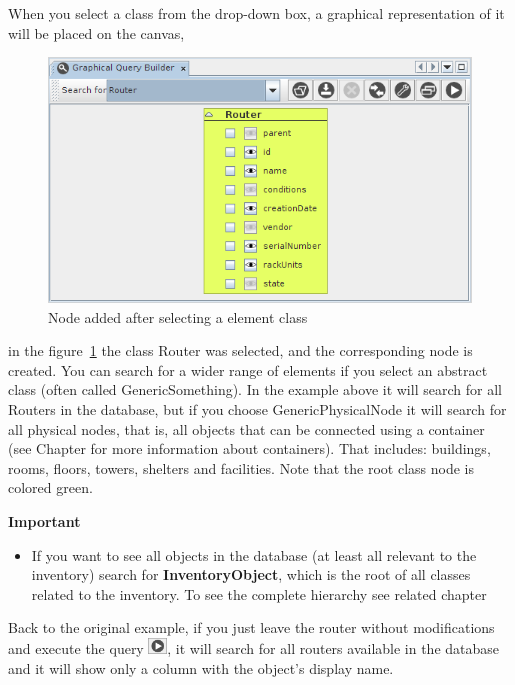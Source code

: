 \documentclass[a4paper]{article}
\begin{document}
	When you select a class from the drop-down box, a graphical representation of it will be placed on the canvas,
	\begin{figure}[h!]
		\centering
		\includegraphics[width=0.9\linewidth]{img/querying_node_added.png}
		\caption{Node added after selecting a element class}
		\label{fig:query_node_added}
	\end{figure}
	in the figure~\ref{fig:query_node_added} the class Router was selected, and the corresponding node is created. You can search for a wider range of elements if you select an abstract class (often called GenericSomething). In the example above it will search for all Routers in the database, but if you choose GenericPhysicalNode it will search for all physical nodes, that is, all objects that can be connected using a container (see Chapter \textbf{} for more information about containers). That includes: buildings, rooms, floors, towers, shelters and facilities. Note that the root class node is colored green.
	
	\newpage
	\begin{framed} {\large \textbf{Important}}
		\begin{itemize}
			\item If you want to see all objects in the database (at least all relevant to the inventory) search for \textbf{InventoryObject}, which is the root of all classes related to the inventory. To see the complete hierarchy see related chapter \textbf{}
		\end{itemize}
	\end{framed}
	
	Back to the original example, if you just leave the router without modifications and execute the query \includegraphics[width=0.5cm]{img/icon_execute_query.png}, it will search for all routers available in the database and it will show only a column with the object's display name.				
	
\end{document}
